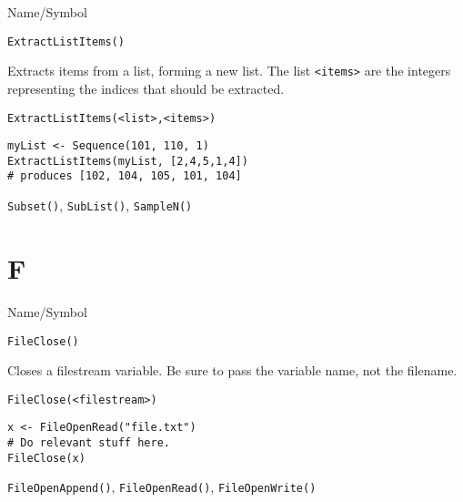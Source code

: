 \rl




\begin{desc}{Name/Symbol}
\item[Name/Symbol]	\verb+ExtractListItems()+

\item[Description]	Extracts items from a list, forming a new list. 
		The list \verb+<items>+ are the integers representing the
		indices that should be extracted.  
	     
\item[Usage]
\begin{verbatim}
ExtractListItems(<list>,<items>)
\end{verbatim}

\item[Example]
\begin{verbatim}
myList <- Sequence(101, 110, 1)
ExtractListItems(myList, [2,4,5,1,4])
# produces [102, 104, 105, 101, 104]
\end{verbatim}

\item[See Also]	\verb+Subset()+, \verb+SubList()+, \verb+SampleN()+
\end{desc}

\rl

\section{F}
\rl



\begin{desc}{Name/Symbol}
\item[Name/Symbol]	\verb+FileClose()+

\item[Description]	Closes a filestream  variable.  Be sure to 
		pass the variable name, not the filename.  

\item[Usage]
\begin{verbatim}
FileClose(<filestream>)
\end{verbatim}

\item[Example]
\begin{verbatim}
x <- FileOpenRead("file.txt")
# Do relevant stuff here.
FileClose(x)
\end{verbatim}

\item[See Also]	\verb+FileOpenAppend()+, \verb+FileOpenRead()+, \verb+FileOpenWrite()+

\end{desc}

